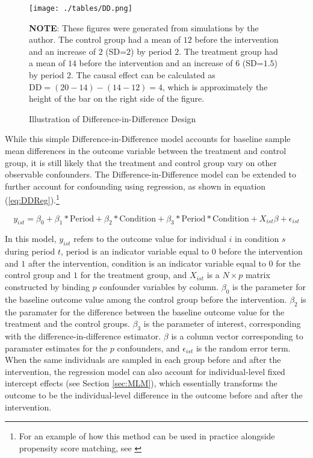 \documentclass[12pt]{article}
\begin{document}
\begin{figure}
    \centering
    \caption{Illustration of Difference-in-Difference Design}
    \texttt{[image: ./tables/DD.png]}
    \begin{minipage}{.8\textwidth}
    \footnotesize
    \textbf{NOTE}: These figures were generated from simulations by the author. The control group had a mean of $12$ before the intervention and an increase of $2$ (SD=$2$) by period $2$. The treatment group had a mean of $14$ before the intervention and an increase of $6$ (SD=$1.5$) by period $2$. The causal effect can be calculated as $\textrm{DD} = (20-14) - (14-12) =4$, which is approximately the height of the bar on the right side of the figure.
    \end{minipage}
    \label{fig:DD}
\end{figure}

While this simple Difference-in-Difference model accounts for baseline sample mean differences in the outcome variable between the treatment and control group, it is still likely that the treatment and control group vary on other observable confounders. The Difference-in-Difference model can be extended to further account for confounding using regression, as shown in equation (\ref{eq:DDReg}).\footnote{For an example of how this method can be used in practice alongside propensity score matching, see \citep{erlanggaImpactPublicHealth2019}}

\begin{equation}
  \label{eq:DDReg}
  y_{ist} = \beta_0 + \beta_1*\textrm{Period} + \beta_2*\textrm{Condition} + \beta_3*\textrm{Period}*\textrm{Condition} + X_{ist}\beta + \epsilon_{ist}
\end{equation}

In this model, $y_{ist}$ refers to the outcome value for individual $i$ in condition $s$ during period $t$, $\textrm{period}$ is an indicator variable equal to $0$ before the intervention and $1$ after the intervention, $\textrm{condition}$ is an indicator variable equal to $0$ for the control group and $1$ for the treatment group, and $X_{ist}$ is a $N \times p$ matrix constructed by binding $p$ confounder variables by column. $\beta_0$ is the parameter for the baseline outcome value among the control group before the intervention. $\beta_2$ is the paramater for the difference between the baseline outcome value for the treatment and the control groups. $\beta_3$ is the parameter of interest, corresponding with the difference-in-difference estimator. $\beta$ is a column vector corresponding to paramater estimates for the $p$ confounders, and $\epsilon_{ist}$ is the random error term. When the same individuals are sampled in each group before and after the intervention, the regression model can also account for individual-level fixed intercept effects (see Section \ref{sec:MLM}), which essentially transforms the outcome to be the individual-level difference in the outcome before and after the intervention.
\end{document}
